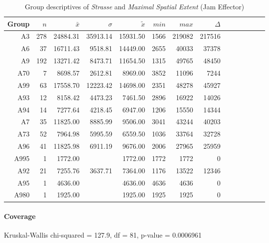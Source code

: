 \begin{table}[ht]
	\tiny
	\centering
	\begin{tabular}{rrrrrrrrrrrrrr}
		\toprule
		Group & $n$ & $\bar{x}$ & $\sigma$ & $\tilde{x}$ & $min$ & $max$ & $\Delta$ \\
		\midrule
		A3   & 278 & 24884.31 & 35913.14 & 15931.50 & 1566 & 219082 & 217516 \\ 
		A6   & 37  & 16711.43 & 9518.81  & 14449.00 & 2655 & 40033  & 37378 \\ 
		A9   & 192 & 13271.42 & 8473.71  & 11654.50 & 1315 & 49765  & 48450 \\ 
		A70  & 7   & 8698.57  & 2612.81  & 8969.00  & 3852 & 11096  & 7244 \\ 
		A99  & 63  & 17558.70 & 12223.42 & 14698.00 & 2351 & 48278  & 45927 \\ 
		A93  & 12  & 8158.42  & 4473.23  & 7461.50  & 2896 & 16922  & 14026 \\ 
		A94  & 14  & 7277.64  & 4218.45  & 6947.00  & 1206 & 15550  & 14344 \\ 
		A7   & 35  & 11825.00 & 8885.99  & 9506.00  & 3041 & 43244  & 40203 \\ 
		A73  & 52  & 7964.98  & 5995.59  & 6559.50  & 1036 & 33764  & 32728 \\ 
		A96  & 41  & 11825.98 & 6911.19  & 9676.00  & 2006 & 27965  & 25959 \\ 
		A995 & 1   & 1772.00  &  		 & 1772.00  & 1772 & 1772   & 0 \\ 
		A92  & 21  & 7255.76  & 3637.71  & 7364.00  & 1176 & 13522  & 12346 \\ 
		A95  & 1   & 4636.00  &  		 & 4636.00  & 4636 & 4636   & 0 \\ 
		A980 & 1   & 1925.00  &  		 & 1925.00  & 1925 & 1925   & 0 \\ 
		\bottomrule
	  \end{tabular}
    \caption{Group descriptives of \textit{Strasse} and \textit{Maximal Spatial Extent} (Jam Effector)}
    \label{tbl:descriptives_baysis_effector_Strasse_SMax}
\end{table}


\paragraph{Coverage}
Kruskal-Wallis chi-squared = 127.9, df = 81, p-value = 0.0006961

